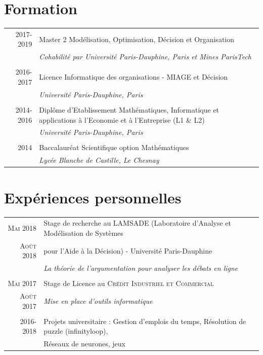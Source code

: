 \documentclass[a4paper,10pt]{article}
\begin{document}

\section{Formation}
\begin{tabular}{r|p{11cm}}
 \textsc{2017-2019} & Master 2 Modélisation, Optimisation, Décision et Organisation \\&\emph{\small{Cohabilité par Université Paris-Dauphine, Paris et Mines ParisTech}}\\\multicolumn{2}{c}{} \\
 \textsc{2016-2017} & Licence Informatique des organisations - MIAGE et Décision \\&\emph{\small{Université Paris-Dauphine, Paris}}\\\multicolumn{2}{c}{} \\
 \textsc{2014-2016} & Diplôme d'Etablissement Mathématiques, Informatique et applications à l'Economie et à l'Entreprise (L1 \& L2) \\&\emph{\small{Université Paris-Dauphine, Paris}}\\\multicolumn{2}{c}{} \\
 \textsc{2014} & Baccalauréat Scientifique option Mathématiques \\&\emph{\small{Lycée Blanche de Castille, Le Chesnay}}\\
\end{tabular}

\section{Expériences personnelles}
\begin{tabular}{rl}	
 \textsc{Mai} 2018 & Stage de recherche au \textsc{LAMSADE} (Laboratoire d'Analyse et Modélisation de Systèmes\\ \textsc{Août} 2018 & pour l'Aide à la Décision) - Université Paris-Dauphine\\
  & \emph{\small{La théorie de l'argumentation pour analyser les débats en ligne}}\\&\\
 \textsc{Mai} 2017 & Stage de Licence au \textsc{Crédit Industriel et Commercial}\\
 \textsc{Août} 2017 & \emph{\small{Mise en place d'outils informatique}}\\&\\
 2016-2018 & Projets universitaire : Gestion d'emplois du temps, Résolution de puzzle (infinityloop),\\& Réseaux de neurones, jeux
\end{tabular}
\end{document}
